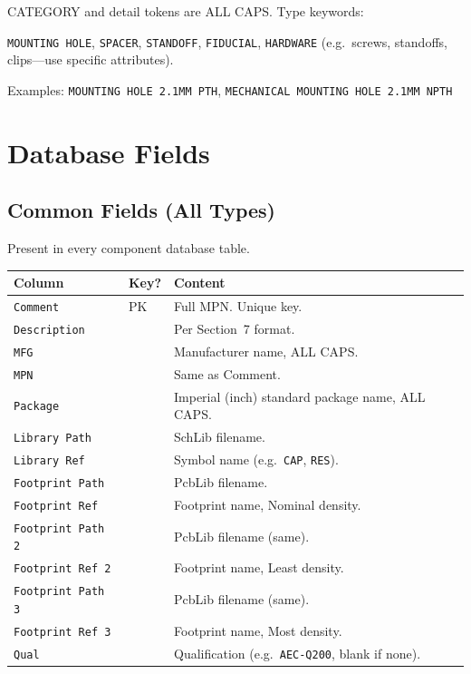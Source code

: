 \documentclass[11pt,a4paper]{article}
\begin{document}
CATEGORY and detail tokens are ALL CAPS. Type keywords:

\texttt{MOUNTING HOLE}, \texttt{SPACER}, \texttt{STANDOFF}, \texttt{FIDUCIAL}, \texttt{HARDWARE} (e.g.\ screws, standoffs, clips---use specific attributes).

Examples: \texttt{MOUNTING HOLE 2.1MM PTH}, \texttt{MECHANICAL MOUNTING HOLE 2.1MM NPTH}

\section{Database Fields}

\subsection{Common Fields (All Types)}

Present in every component database table.

\begin{longtable}{@{}llL{7.5cm}@{}}
\toprule
Column & Key? & Content \\
\midrule
\endhead
\texttt{Comment}          & PK & Full MPN. Unique key. \\
\texttt{Description}      &    & Per Section~7 format. \\
\texttt{MFG}              &    & Manufacturer name, ALL CAPS. \\
\texttt{MPN}              &    & Same as Comment. \\
\texttt{Package}          &    & Imperial (inch) standard package name, ALL CAPS. \\
\texttt{Library Path}     &    & SchLib filename. \\
\texttt{Library Ref}      &    & Symbol name (e.g.\ \texttt{CAP}, \texttt{RES}). \\
\texttt{Footprint Path}   &    & PcbLib filename. \\
\texttt{Footprint Ref}    &    & Footprint name, Nominal density. \\
\texttt{Footprint Path 2} &    & PcbLib filename (same). \\
\texttt{Footprint Ref 2}  &    & Footprint name, Least density. \\
\texttt{Footprint Path 3} &    & PcbLib filename (same). \\
\texttt{Footprint Ref 3}  &    & Footprint name, Most density. \\
\texttt{Qual}             &    & Qualification (e.g.\ \texttt{AEC-Q200}, blank if none). \\
\bottomrule
\end{longtable}
\end{document}
